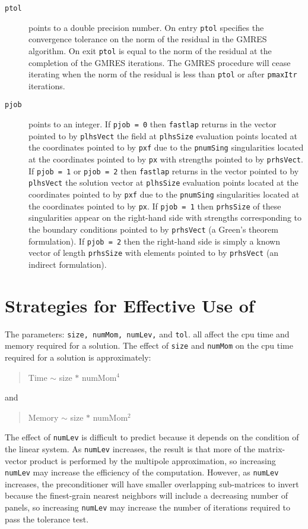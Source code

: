 \begin{description}
\item[{\tt ptol}] points to a double precision number.  On entry {\tt *ptol}
specifies the convergence tolerance on the norm of the residual in
the GMRES algorithm.  On exit {\tt *ptol} is equal to the norm of the
residual at the completion of the GMRES iterations.  The GMRES
procedure will cease iterating when the norm of the residual is less
than {\tt *ptol} or after {\tt *pmaxItr} iterations.

\item[{\tt pjob}] points to an integer.  
If {\tt *pjob = 0} then
{\tt fastlap} returns in the vector pointed to by {\tt plhsVect} the field 
at {\tt *plhsSize} evaluation points located at the coordinates pointed to by 
{\tt pxf} due to the {\tt *pnumSing} singularities located at the 
coordinates pointed to by {\tt px} with strengths pointed to by 
{\tt prhsVect}.  
If {\tt *pjob = 1} or {\tt *pjob = 2} then
{\tt fastlap} returns in the vector pointed to by {\tt plhsVect} the solution
vector at {\tt *plhsSize} evaluation points located at the coordinates 
pointed to by {\tt pxf} due to the {\tt *pnumSing} singularities located 
at the coordinates pointed to by {\tt px}.  If {\tt *pjob = 1} then
{\tt *prhsSize} of these singularities appear on the right-hand side 
with strengths corresponding to the boundary conditions pointed to by 
{\tt prhsVect} (a Green's theorem formulation).  If {\tt *pjob = 2} then 
the right-hand side is simply a known vector of length {\tt *prhsSize} with 
elements pointed to by {\tt prhsVect} (an indirect formulation). 
\end{description}

\newpage
\section{Strategies for Effective Use of \fas}
\label{s:strat}
The parameters: {\tt size, numMom, numLev,} and {\tt tol}.  
all affect the cpu time and memory required for a solution.
The effect of  {\tt size} and {\tt numMom} on the cpu time required 
for a solution is approximately:

\begin{quote}
Time $\sim$ size $*$ numMom$^4$
\end{quote} 

\noindent and

\begin{quote}
Memory $\sim$ size $*$ numMom$^2$
\end{quote}

The effect of {\tt numLev} is difficult to predict because it depends on
the condition of the linear system.  As {\tt numLev} increases, the result 
is that more of the matrix-vector product is performed by the multipole 
approximation, so increasing {\tt numLev} may increase the efficiency of 
the computation.  However, as {\tt numLev} increases, the preconditioner
will have smaller overlapping sub-matrices to invert because the finest-grain 
nearest neighbors will include a decreasing number of panels, so 
increasing {\tt numLev} may increase the number of iterations required
to pass the tolerance test.  

